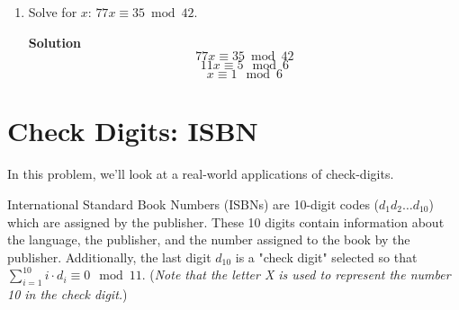 \documentclass[11pt]{article}
\newcommand*{\Question}[1]{\section{#1}}
\newenvironment{Parts}{\begin{enumerate}[label=(\alph*)]}{\end{enumerate}}
\newcommand*{\Part}{\item}
\newenvironment{Answer}{\vspace{10pt}\begin{mdframed}\textbf{Solution}\\}{\end{mdframed}\vfill\pagebreak[3]}
\newenvironment{Answer}{\vspace{10pt}}{\vfill\pagebreak[3]}
\begin{document}
\begin{Parts}
\begin{Answer}
	    Thus, all solutions must meet the condition where the arbitrary $k$ is in the range of 0 to $d-1$. Since $\frac{a}{d}x \equiv \frac{b}{d} \mod \frac{m}{d}$ is equivalent to $ax \equiv b \mod m$, the statement must also hold for $ax \equiv b \mod m$.
	    
	\end{Answer}
	\Part Solve for $x$: $77x \equiv 35 \bmod 42$.
	\begin{Answer}
		$$77x \equiv 35 \bmod 42$$
		$$11x \equiv  5 \mod 6$$
		$$x \equiv 1 \mod 6$$
	\end{Answer}
		
\end{Parts}


\Question{Check Digits: ISBN} In this problem, we'll look at a real-world applications of check-digits.

International Standard Book Numbers (ISBNs) are 10-digit codes ($d_1d_2\ldots d_{10}$) which are assigned by the publisher. These 10 digits contain information about the language, the publisher, and the number assigned to the book by the publisher. Additionally, the last digit $d_{10}$ is a "check digit" selected so that $\sum_{i=1}^{10} i \cdot d_i \equiv 0 \mod 11$. (\textit{Note that the letter X is used to represent the number 10 in the check digit.})
\end{document}
